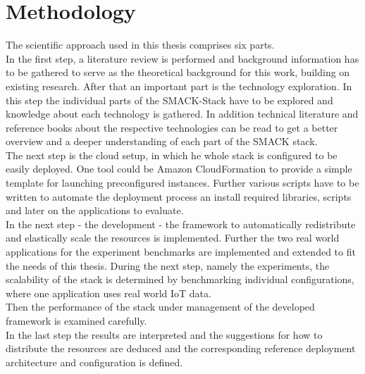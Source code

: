 \section{Methodology}
The scientific approach used in this thesis comprises six parts.\\
In the first step, a literature review is performed and background information has to be gathered to serve as the theoretical background for this work, building on existing research.
After that an important part is the technology exploration.
In this step the individual parts of the SMACK-Stack have to be explored and knowledge about each technology is gathered.
In addition technical literature and reference books about the respective technologies can be read to get a better overview and a deeper understanding of each part of the SMACK stack.\\
The next step is the cloud setup, in which he whole stack is configured to be easily deployed.
One tool could be Amazon CloudFormation to provide a simple template for launching preconfigured instances.
Further various scripts have to be written to automate the deployment process an install required libraries, scripts and later on the applications to evaluate.\\
In the next step - the development - the framework to automatically redistribute and elastically scale the resources is implemented.
Further the two real world applications for the experiment benchmarks are implemented and extended to fit the needs of this thesis.
During the next step, namely the experiments, the scalability of the stack is determined by benchmarking individual configurations, where one application uses real world IoT data.\\
Then the performance of the stack under management of the developed framework is examined carefully.\\
In the last step the results are interpreted and the suggestions for how to distribute the resources are deduced and the corresponding reference deployment architecture and configuration is defined.
